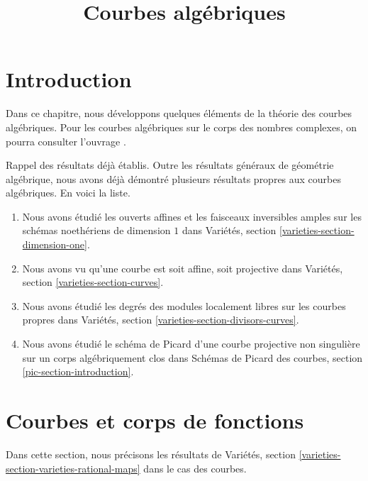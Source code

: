 

%


\title{Courbes algébriques}


\maketitle

\label{section-phantom}

\tableofcontents

\section{Introduction}
\label{section-introduction}

\noindent
Dans ce chapitre, nous développons quelques éléments de la théorie des courbes algébriques. Pour les courbes algébriques sur le corps des nombres complexes, on pourra consulter l'ouvrage \cite{ACGH}.

\medskip\noindent
Rappel des résultats déjà établis. Outre les résultats généraux de géométrie algébrique, nous avons déjà démontré plusieurs résultats propres aux courbes algébriques. En voici la liste. \begin{enumerate} \item Nous avons étudié les ouverts affines et les faisceaux inversibles amples sur les schémas noethériens de dimension $1$ dans Variétés, section \ref{varieties-section-dimension-one}. \item Nous avons vu qu'une courbe est soit affine, soit projective dans Variétés, section \ref{varieties-section-curves}. \item Nous avons étudié les degrés des modules localement libres sur les courbes propres dans Variétés, section \ref{varieties-section-divisors-curves}. \item Nous avons étudié le schéma de Picard d'une courbe projective non singulière sur un corps algébriquement clos dans Schémas de Picard des courbes, section \ref{pic-section-introduction}.
\end{enumerate}





\section{Courbes et corps de fonctions}
\label{section-curves-function-fields}

\noindent
Dans cette section, nous précisons les résultats de Variétés, section \ref{varieties-section-varieties-rational-maps} dans le cas des courbes.

